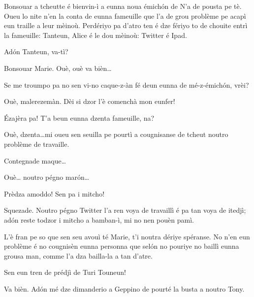 \begin{drama}
\Mariespeaks Bonsouar a tcheutte é bienvin-ì a eunna noua émich\'on de \og N’a de pousta pe tè\fg. Oueu lo nite n'en la conta de eunna fameuille que l’a de grou problème pe acapì eun traille a leur mèinoù. Perdériyo pa d'atro ten é dze fériyo to de chouite entrì la fameuille: Tanteun, Alice é le dou mèinoù: Twitter é Ipad.


\Mariespeaks Ad\'on Tanteun, va-tì?

\Tanteunspeaks{} Bonsouar Marie. Ouè, ouè va bièn\ldots

\Mariespeaks Se me troumpo pa no sen vi-no caque-z-àn fé deun eunna de mé-z-émich\'on, vrèi?

\Tanteunspeaks{} Ouè,  malerezemàn. Dèi si dzor l’è comenchà mon eunfer!

\Mariespeaks \'Ezajèra pa! T’a beun eunna dzenta fameuille, na?

\Tanteunspeaks Ouè, dzenta\ldots mi oueu sen seuilla pe pourtì a cougnisanse de tcheut noutro problème de travaille.

\Mariespeaks Contegnade maque\ldots

\Tanteunspeaks Ouè\ldots {} noutro pégno mar\'on\ldots


\Alicespeaks Prèdza amoddo! Sen pa i mitcho!

\Tanteunspeaks Squezade. Noutro pégno Twitter l’a ren voya de travaillì é pa tan voya de itedjì; ad\'on reste todzor i mitcho a bamban-ì, mi no nen pouèn pamì.

\Alicespeaks L’è fran pe so que sen seu avouì té Marie, t’i noutra dériye spéranse. No n'en eun problème é no cougnisèn eunna personna que sel\'on no pouriye no baillì eunna grousa man, comme  l’a dza bailla-la a tan d’atre.

\Twitterspeaks{} Sen eun tren de prédjì de Turi Touneun!

\Mariespeaks Va bièn. Ad\'on mé dze dimanderio a Geppino de pourté la busta a noutro Tony.



\end{drama}
